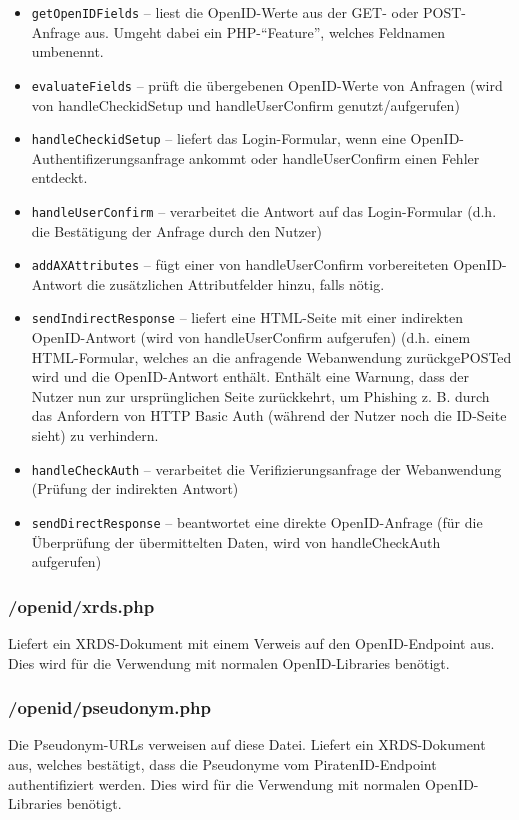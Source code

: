 \begin{itemize}
	\item \texttt{getOpenIDFields} -- liest die OpenID-Werte aus der GET- oder POST-Anfrage aus. Umgeht dabei ein PHP-"`Feature"', welches Feldnamen umbenennt.
	\item \texttt{evaluateFields} -- prüft die übergebenen OpenID-Werte von Anfragen (wird von handleCheckidSetup und handleUserConfirm genutzt/aufgerufen)
	\item \texttt{handleCheckidSetup} -- liefert das Login-Formular, wenn eine OpenID-Authentifizerungsanfrage ankommt oder handleUserConfirm einen Fehler entdeckt.
	\item \texttt{handleUserConfirm} -- verarbeitet die Antwort auf das Login-Formular (d.h. die Bestätigung der Anfrage durch den Nutzer)
	\item \texttt{addAXAttributes} -- fügt einer von handleUserConfirm vorbereiteten OpenID-Antwort die zusätzlichen Attributfelder hinzu, falls nötig.
	\item \texttt{sendIndirectResponse} -- liefert eine HTML-Seite mit einer indirekten OpenID-Antwort (wird von handleUserConfirm aufgerufen)
											(d.h. einem HTML-Formular, welches an die anfragende Webanwendung zurückgePOSTed wird und die OpenID-Antwort enthält.
											Enthält eine Warnung, dass der Nutzer nun zur ursprünglichen Seite zurückkehrt,
											um Phishing z. B. durch das Anfordern von HTTP Basic Auth (während der Nutzer noch die ID-Seite sieht) zu verhindern.
	\item \texttt{handleCheckAuth} -- verarbeitet die Verifizierungsanfrage der Webanwendung (Prüfung der indirekten Antwort)
	\item \texttt{sendDirectResponse} -- beantwortet eine direkte OpenID-Anfrage (für die Überprüfung der übermittelten Daten, wird von handleCheckAuth aufgerufen)
\end{itemize}



\subsubsection{/openid/xrds.php}
Liefert ein XRDS-Dokument mit einem Verweis auf den OpenID-Endpoint aus.
Dies wird für die Verwendung mit normalen OpenID-Libraries benötigt.

\subsubsection{/openid/pseudonym.php}
Die Pseudonym-URLs verweisen auf diese Datei.
Liefert ein XRDS-Dokument aus, welches bestätigt, dass die Pseudonyme vom PiratenID-Endpoint authentifiziert werden.
Dies wird für die Verwendung mit normalen OpenID-Libraries benötigt.


